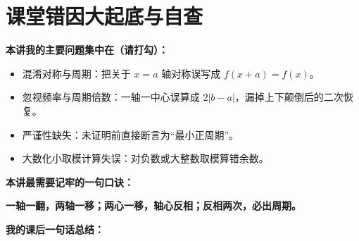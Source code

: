 \documentclass[11pt,a4paper]{ctexart}
\begin{document}


\newpage

\section{课堂错因大起底与自查}

\vspace{0.5em}
\noindent\textbf{本讲我的主要问题集中在（请打勾）：}
\begin{itemize}[itemsep=0.4em]
  \item \checkbox 混淆对称与周期：把关于 $x=a$ 轴对称误写成 $f(x+a)=f(x)$。
  \item \checkbox 忽视频率与周期倍数：一轴一中心误算成 $2|b-a|$，漏掉上下颠倒后的二次恢复。
  \item \checkbox 严谨性缺失：未证明前直接断言为“最小正周期”。
  \item \checkbox 大数化小取模计算失误：对负数或大整数取模算错余数。
\end{itemize}

\vspace{1em}
\noindent\textbf{本讲最需要记牢的一句口诀：}
\vspace{0.5em}

\begin{tcolorbox}[
  enhanced,
  colback=gray!5,
  colframe=black,
  boxrule=0.8pt,
  arc=0pt,
  center title
]
  \centering\bfseries\large
  一轴一翻，两轴一移；两心一移，轴心反相；反相两次，必出周期。
\end{tcolorbox}

\vspace{1em}
\noindent\textbf{我的课后一句话总结：}
\vspace{0.5em}

\blank{14cm}
\end{document}
